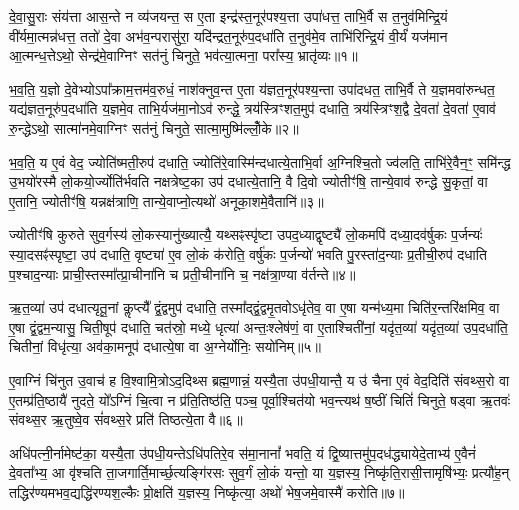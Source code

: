 \setcounter{anuvakam}{0}
दे॒वा॒सु॒राः संय॑त्ता आस॒न्ते न व्य॑जयन्त॒ स ए॒ता इन्द्र॑स्त॒नूर॑पश्य॒त्ता उपा॑धत्त॒ ताभि॒र्वै स त॒नुव॑मिन्द्रि॒यं वी॑र्यमा॒त्मन्न॑धत्त॒ ततो॑ दे॒वा अभ॑व॒न्परासु॑रा॒ यदि॑न्द्रत॒नूरु॑प॒दधा॑ति त॒नुव॑मे॒व ताभि॑रिन्द्रि॒यं वी॒र्यं॑ यज॑मान आ॒त्मन्ध॒त्ते\-ऽथो॒ सेन्द्र॑मे॒वाग्निꣳ सत॑नुं चिनुते॒ भव॑त्या॒त्मना॒ परा᳚स्य॒ भ्रातृ॑व्यः॥१॥

भ॒व॒ति॒ य॒ज्ञो दे॒वेभ्यो\-ऽपा᳚क्राम॒त्तम॑व॒रुधं॒ नाश॑क्नुव॒न्त ए॒ता य॑ज्ञत॒नूर॑पश्य॒न्ता उपा॑दधत॒ ताभि॒र्वै ते य॒ज्ञमवा॑रुन्धत॒ यद्य॑ज्ञत॒नूरु॑प॒दधा॑ति य॒ज्ञमे॒व ताभि॒र्यज॑मा॒नो\-ऽव॑ रुन्द्धे॒ त्रय॑स्त्रिꣳशत॒मुप॑ दधाति॒ त्रय॑स्त्रिꣳश॒द्वै दे॒वता॑ दे॒वता॑ ए॒वाव॑ रु॒न्द्धे\-ऽथो॒ सात्मा॑नमे॒वाग्निꣳ सत॑नुं चिनुते॒ सात्मा॒मुष्मि॑ल्लोँ॒के॥२॥

भ॒व॒ति॒ य ए॒वं वेद॒ ज्योति॑ष्मती॒रुप॑ दधाति॒ ज्योति॑रे॒वास्मि॑न्दधात्ये॒ताभि॒र्वा अ॒ग्निश्चि॒तो ज्व॑लति॒ ताभि॑रे॒वैन॒ꣳ॒ समि॑न्द्ध उ॒भयो॑रस्मै लो॒कयो॒र्ज्योति॑र्भवति नक्षत्रेष्ट॒का उप॑ दधात्ये॒तानि॒ वै दि॒वो ज्योतीꣳ॑षि॒ तान्ये॒वाव॑ रुन्द्धे सु॒कृतां॒ वा ए॒तानि॒ ज्योतीꣳ॑षि॒ यन्नक्ष॑त्राणि॒ तान्ये॒वाप्नो॒त्यथो॑ अनूका॒शमे॒वैतानि॑॥३॥

ज्योतीꣳ॑षि कुरुते सुव॒र्गस्य॑ लो॒कस्यानु॑ख्यात्यै॒ यथ्सꣴस्पृ॑ष्टा उपद॒ध्याद्वृष्ट्यै॑ लो॒कमपि॑ दध्या॒दव॑र्\mbox{}षुकः प॒र्जन्यः॑ स्या॒दसꣴ॑स्पृष्टा॒ उप॑ दधाति॒ वृष्ट्या॑ ए॒व लो॒कं क॑रोति॒ वर्\mbox{}षु॑कः प॒र्जन्यो॑ भवति पु॒रस्ता॑द॒न्याः प्र॒तीची॒रुप॑ दधाति प॒श्चाद॒न्याः प्राची॒स्तस्मा᳚त्प्रा॒चीना॑नि च प्रती॒चीना॑नि च॒ नक्ष॑त्रा॒ण्या व॑र्तन्ते॥४॥

{\anuvakamend[{भ्रातृ॑व्यो लो॒क ए॒वैतान्येक॑चत्वारिꣳशच्च॥१॥}]}

ऋ॒त॒व्या॑ उप॑ दधात्यृतू॒नां कॢप्त्यै᳚ द्वं॒द्वमुप॑ दधाति॒ तस्मा᳚द्द्वं॒द्वमृ॒तवो\-ऽधृ॑तेव॒ वा ए॒षा यन्म॑ध्य॒मा चिति॑र॒न्तरि॑क्षमिव॒ वा ए॒षा द्वं॒द्वम॒न्यासु॒ चिती॒षूप॑ दधाति॒ चत॑स्रो॒ मध्ये॒ धृत्या॑ अन्तः॒श्लेष॑णं॒ वा ए॒ताश्चिती॑नां॒ यदृ॑त॒व्या॑ यदृ॑त॒व्या॑ उप॒दधा॑ति॒ चितीनां॒ विधृ॑त्या॒ अव॑का॒मनूप॑ दधात्ये॒षा वा अ॒ग्नेर्योनिः॒ सयो॑निम्॥५॥

ए॒वाग्निं चि॑नुत उ॒वाच॑ ह वि॒श्वामि॒त्रो\-ऽद॒दिथ्स ब्रह्म॒णान्नं॒ यस्यै॒ता उ॑पधी॒यान्तै॒ य उ॑ चैना ए॒वं वेद॒दिति॑ संवथ्स॒रो वा ए॒तम्प्र॑ति॒ष्ठायै॑ नुदते॒ यो᳚\-ऽग्निं चि॒त्वा न प्र॑ति॒तिष्ठ॑ति॒ पञ्च॒ पूर्वा॒श्चित॑यो भव॒न्त्यथ॑ ष॒ष्ठीं चितिं॑ चिनुते॒ षड्वा ऋ॒तवः॑ संवथ्स॒र ऋ॒तुष्वे॒व सं॑वथ्स॒रे प्रति॑ तिष्ठत्ये॒ता वै॥६॥

अधि॑पत्नी॒र्नामेष्ट॑का॒ यस्यै॒ता उ॑पधी॒यन्ते\-ऽधि॑पतिरे॒व स॑मा॒नानां᳚ भवति॒ यं द्वि॒ष्यात्तमु॑प॒दध॑द्ध्यायेदे॒ताभ्य॑ ए॒वैनं॑ दे॒वता᳚भ्य॒ आ वृ॑श्चति ता॒जगार्ति॒मार्च्छ॒त्यङ्गि॑रसः सुव॒र्गं लो॒कं यन्तो॒ या य॒ज्ञस्य॒ निष्कृ॑ति॒रासी॒त्तामृषि॑भ्यः॒ प्रत्यौ॑ह॒न् तद्धिर॑ण्यमभव॒द्यद्धि॑रण्यश॒ल्कैः प्रो॒क्षति॑ य॒ज्ञस्य॒ निष्कृ॑त्या॒ अथो॑ भेष॒जमे॒वास्मै॑ करोति॥७॥

